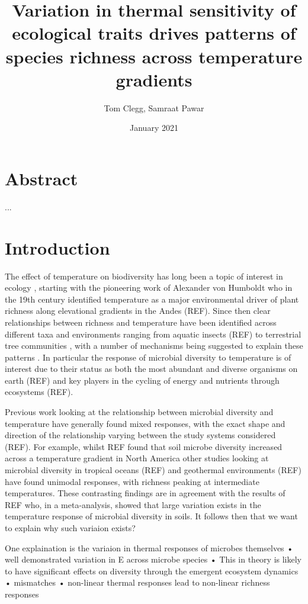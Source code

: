 \documentclass{article}
\title{Variation in thermal sensitivity of ecological traits drives patterns of species richness across temperature gradients}
\author{Tom Clegg, Samraat Pawar}
\date{January 2021}
\begin{document}
\maketitle

\section*{Abstract}

...

\section*{Introduction}

The effect of temperature on biodiversity has long been a topic of interest in ecology \citep{Gaston2000}, starting with the pioneering work of Alexander von Humboldt who in the 19th century identified temperature as a major environmental driver of plant richness along elevational gradients in the Andes (REF). Since then clear relationships between richness and temperature have been identified across different taxa and environments ranging from aquatic insects (REF) to terrestrial tree communities \citep{Wang2009}, with a number of mechanisms being suggested to explain these patterns \citep{Rohde1992,Gaston2000}. In particular the response of microbial diversity to temperature is of interest due to their status as both the most abundant and diverse organisms on earth (REF) and key players in the cycling of energy and nutrients through ecosystems (REF). 

Previous work looking at the relationship between microbial diversity and temperature have generally found mixed responses, with the exact shape and direction of the relationship varying between the study systems considered (REF). For example, whilst REF found that soil microbe diversity increased across a temperature gradient in North America other studies looking at microbial diversity in tropical oceans (REF) and geothermal environments (REF) have found unimodal responses, with richness peaking at intermediate temperatures. These contrasting findings are in agreement with the results of REF who, in a meta-analysis, showed that large variation exists in the temperature response of microbial diversity in soils. It follows then that we want to explain why such variaion exists?

One explaination is the variaion in thermal responses of microbes themselves
• well demonstrated variation in E across microbe species
• This in theory is likely to have significant effects on diversity through the emergent ecosystem dynamics
• mismatches
• non-linear thermal responses lead to non-linear richness responses
\end{document}
